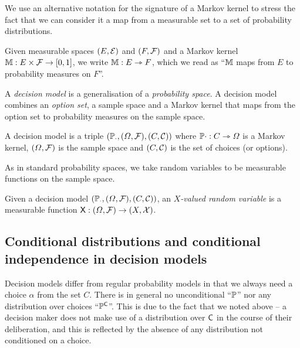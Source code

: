 We use an alternative notation for the signature of a Markov kernel to stress the fact that we can consider it a map from a measurable set to a set of probability distributions.

\begin{notation}
Given measurable spaces $(E,\mathcal{E})$ and $(F,\mathcal{F})$ and a Markov kernel $\mathbb{M}:E\times\mathcal{F}\to [0,1]$, we write $\mathbb{M}:E\rightarrowtriangle F$, which we read as ``$\mathbb{M}$ maps from $E$ to probability measures on $F$''.
\end{notation}

A \emph{decision model} is a generalisation of a \emph{probability space}. A decision model combines an \emph{option set}, a sample space and a Markov kernel that maps from the option set to probability measures on the sample space.

\begin{definition}\label{def:dec_model}
A decision model is a triple $(\mathbb{P}_\cdot, (\Omega,\mathcal{F}), (C,\mathcal{C}))$ where $\mathbb{P}\cdot:C\rightarrowtriangle \Omega$ is a Markov kernel, $(\Omega,\mathcal{F})$ is the sample space and $(C,\mathcal{C})$ is the set of choices (or options).
\end{definition}

As in standard probability spaces, we take random variables to be measurable functions on the sample space.

\begin{definition}\label{def:variable}
Given a decision model $(\mathbb{P}_\cdot, (\Omega,\mathcal{F}), (C,\mathcal{C}))$, an \emph{$X$-valued random variable} is a measurable function $\mathsf{X}:(\Omega,\mathcal{F})\to (X,\mathcal{X})$.
\end{definition}

\subsection{Conditional distributions and conditional independence in decision models}

Decision models differ from regular probability models in that we always need a choice $\alpha$ from the set $C$. There is in general no unconditional ``$\mathbb{P}$'' nor any distribution over choices ``$\mathbb{P}^{\mathsf{C}}$''. This is due to the fact that we noted above -- a decision maker does not make use of a distribution over $\mathsf{C}$ in the course of their deliberation, and this is reflected by the absence of any distribution not conditioned on a choice.

